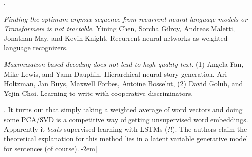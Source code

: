 \documentclass[11pt]{article}
\begin{document}
. 
\begin{compactitem}
	\item \textit{Finding the optimum argmax sequence from recurrent neural language models or Transformers is not tractable}. Yining Chen, Sorcha Gilroy, Andreas Maletti, Jonathan May, and Kevin Knight. Recurrent neural networks as weighted language recognizers. 
	
	\item \textit{Maximization-based decoding does not lead to high quality text.} (1) Angela Fan, Mike Lewis, and Yann Dauphin. Hierarchical neural story generation. Ari Holtzman, Jan Buys, Maxwell Forbes, Antoine Bosselut, (2) David Golub, and Yejin Choi. Learning to write with cooperative discriminators.
\end{compactitem}















\label{Embeddings and Transfer Learning}




\myspace
\p {}. It turns out that simply taking a weighted average of word vectors and doing some PCA/SVD is a competitive way of getting unsupervised word embeddings. Apparently it \textit{beats} supervised learning with LSTMs (?!). The authors claim the theoretical explanation for this method lies in a latent variable generative model for sentences (of course).[-2em]
\end{document}
